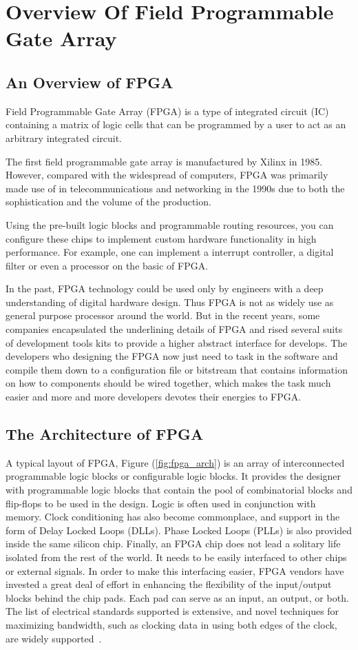 \chapter{Overview Of Field Programmable Gate Array}

\section{An Overview of FPGA}
Field Programmable Gate Array (FPGA) is a type of integrated circuit (IC)
containing a matrix of logic cells that can be programmed by a user to act
as an arbitrary integrated circuit.

The first field programmable gate array is manufactured by Xilinx
in 1985. However, compared with the widespread of computers, FPGA
was primarily made use of in telecommunications and networking in
the 1990s due to both the sophistication and the volume of the production.

Using the pre-built logic blocks and
programmable routing resources, you can configure these chips to implement
custom hardware functionality in high performance. For example, one can implement a
interrupt controller, a digital filter or even a processor on the basic of
FPGA.

In the past, FPGA technology could be used only by
engineers with a deep understanding of digital hardware design. Thus FPGA is
not as widely use as general purpose processor around the world. But in
the recent years, some companies encapsulated the underlining details of
FPGA and rised several suits of development tools kits to provide a higher
abstract interface for develops. The developers who designing the FPGA now
just need to task in the software and compile them down to a configuration
file or bitstream that contains information on how to components should be
wired together, which makes the task much easier and more and more
developers devotes their energies to FPGA.

\section{The Architecture of FPGA}

A typical layout of FPGA, Figure (\ref{fig:fpga_arch}) is an array of
interconnected programmable logic blocks or configurable logic blocks. It
provides the designer with programmable logic blocks that contain the pool
of combinatorial blocks and flip-flops to be used in the design. Logic is
often used in conjunction with memory. Clock conditioning has also become
commonplace, and support in the form of Delay Locked Loops (DLLs). Phase
Locked Loops (PLLs) is also provided inside the same silicon chip. Finally,
an FPGA chip does not lead a solitary life isolated from the rest of the
world. It needs to be easily interfaced to other chips or external signals.
In order to make this interfacing easier, FPGA vendors have invested a
great deal of effort in enhancing the flexibility of the input/output
blocks behind the chip pads. Each pad can serve as an input, an output, or
both. The list of electrical standards supported is extensive, and novel
techniques for maximizing bandwidth, such as clocking data in using both
edges of the clock, are widely supported~\cite{fpgaintro}.

